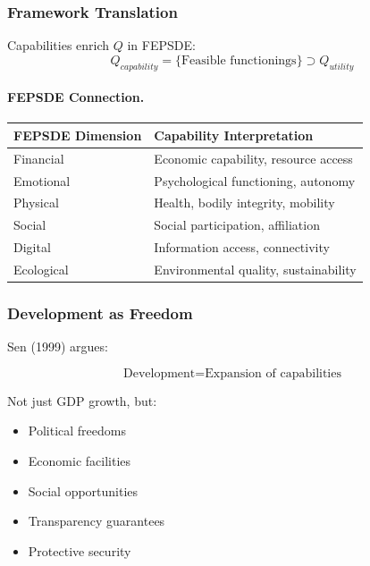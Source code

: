 \subsubsection{Framework Translation}

Capabilities enrich $Q$ in FEPSDE:
\begin{equation}
Q_{capability} = \{\text{Feasible functionings}\} \supset Q_{utility}
\end{equation}

\paragraph{FEPSDE Connection.}
\begin{center}
\renewcommand{\arraystretch}{1.3}
\begin{tabular}{|l|l|}
\hline
\textbf{FEPSDE Dimension} & \textbf{Capability Interpretation} \\
\hline
Financial & Economic capability, resource access \\
Emotional & Psychological functioning, autonomy \\
Physical & Health, bodily integrity, mobility \\
Social & Social participation, affiliation \\
Digital & Information access, connectivity \\
Ecological & Environmental quality, sustainability \\
\hline
\end{tabular}
\end{center}

\subsubsection{Development as Freedom}

Sen (1999) argues:

\begin{equation}
\text{Development} = \text{Expansion of capabilities}
\end{equation}

Not just GDP growth, but:
\begin{itemize}
    \item Political freedoms
    \item Economic facilities
    \item Social opportunities
    \item Transparency guarantees
    \item Protective security
\end{itemize}

